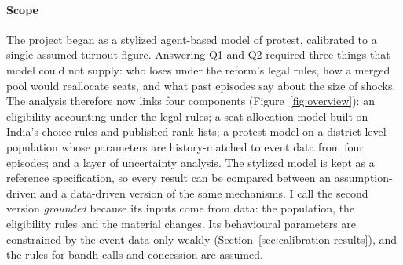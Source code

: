 \documentclass[11pt,a4paper]{article}
\begin{document}
\paragraph{Scope} The project began as a stylized agent-based model of protest, calibrated to a single assumed turnout figure. Answering Q1 and Q2 required three things that model could not supply: who loses under the reform's legal rules, how a merged pool would reallocate seats, and what past episodes say about the size of shocks. The analysis therefore now links four components (Figure~\ref{fig:overview}): an eligibility accounting under the legal rules; a seat-allocation model built on India's choice rules and published rank lists; a protest model on a district-level population whose parameters are history-matched to event data from four episodes; and a layer of uncertainty analysis. The stylized model is kept as a reference specification, so every result can be compared between an assumption-driven and a data-driven version of the same mechanisms. I call the second version \emph{grounded} because its inputs come from data: the population, the eligibility rules and the material changes. Its behavioural parameters are constrained by the event data only weakly (Section~\ref{sec:calibration-results}), and the rules for bandh calls and concession are assumed.
\end{document}
